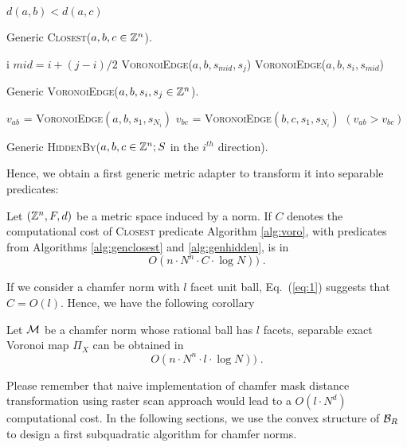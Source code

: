 \documentclass{llncs}
\begin{document}
\begin{algorithm}[H]
  \Return $d(a,b) < d(a,c)$\;
  \caption{Generic \textsc{Closest}($a,b,c\in{\mathbb{Z}}^n$).\label{alg:genclosest}}
\end{algorithm}


\begin{algorithm}[H]
     {
       \Return  i
     }
     $mid  = i + (j-i)/2$\;
       {
         \Return \textsc{VoronoiEdge}($a,b,s_{mid},s_j$)
}
 {
         \Return \textsc{VoronoiEdge}($a,b,s_{i},s_{mid}$)
}

  \caption{Generic \textsc{VoronoiEdge}($a,b,s_i,s_j\in{\mathbb{Z}}^n$).\label{alg:genedge}}
\end{algorithm}

\begin{algorithm}[H]
  $v_{ab}$ = \textsc{VoronoiEdge}$(a,b,s_1, s_{N_i})$\;
  $v_{bc}$ = \textsc{VoronoiEdge}$(b,c,s_1, s_{N_i})$\;
  \Return $(v_{ab}> v_{bc})$\;
  \caption{Generic \textsc{HiddenBy}($a,b,c\in{\mathbb{Z}}^n; S$ in the $i^{th}$
    direction).\label{alg:genhidden}}
\end{algorithm}

Hence, we obtain a first generic metric adapter to transform it into
separable predicates:

\begin{lemma}
\label{lem:generic}
   Let $({\mathbb{Z}}^n, F, d)$ be a metric space induced by a norm. If $C$
   denotes the computational cost of \textsc{Closest} predicate
   Algorithm \ref{alg:voro},  with predicates from Algorithms
   \ref{alg:genclosest} and \ref{alg:genhidden}, is in
  \begin{equation}
    O(n\cdot N^n\cdot C\cdot \log{N}))\;.
  \end{equation}
\end{lemma}

If we consider a chamfer norm with $l$ facet unit ball, Eq.~(\ref{eq:1})
suggests that $C=O(l)$. Hence, we have the following corollary
\begin{corollary}
  Let $\mathcal{M}$ be a chamfer norm whose rational ball has $l$ facets,
  separable exact Voronoi map $\Pi_X$ can be obtained in
 \begin{equation}
    O(n\cdot N^n\cdot l \cdot \log{N}))\;.
  \end{equation}
\end{corollary}

Please remember that naive implementation of chamfer mask distance
transformation using raster scan approach would lead to a $O(l\cdot
N^d)$ computational cost. In the following sections, we use the convex
structure of $\mathcal{B}_R$ to design a first subquadratic algorithm for chamfer
norms.
\end{document}
